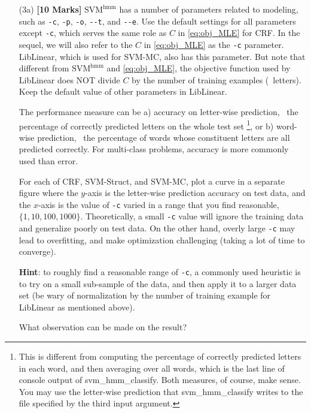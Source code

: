 \documentclass[11pt]{report}
\begin{document}
\begin{itemize}
	\item[(3a)] {\bf [10 Marks]} $\text{SVM}^{\text{hmm}}$ has a number of parameters related to modeling, such as \verb#-c#, \verb#-p#, \verb#-o#, \verb#--t#, and \verb#--e#.
	Use the default settings for all parameters except \verb#-c#,
	which serves the same role as $C$ in \eqref{eq:obj_MLE} for CRF.
	In the sequel, we will also refer to the $C$ in \eqref{eq:obj_MLE} as the \verb#-c# parameter.
	LibLinear, which is used for SVM-MC, also has this parameter.
	But note that different from $\text{SVM}^{\text{hmm}}$ and \eqref{eq:obj_MLE}, the objective function used by LibLinear does NOT divide $C$ by the number of training examples (\ie\ letters).
	Keep the default value of other parameters in LibLinear.
	
	The performance measure can be a) accuracy on letter-wise prediction, \ie\ the percentage of correctly predicted letters on the whole test set%
	\footnote{This is different from computing the percentage of correctly predicted letters in each word, and then averaging over all words, which is the last line of console output of \textsf{svm\_hmm\_classify}.  Both measures, of course, make sense.
		You may use the letter-wise prediction that \textsf{svm\_hmm\_classify} writes to the file specified by the third input argument.},
	or b) word-wise prediction, \ie\ the percentage of words whose constituent letters are all predicted correctly.
	For multi-class problems, accuracy is more commonly used than error.
	
	For each of CRF, SVM-Struct, and SVM-MC,
	plot a curve in a separate figure where the $y$-axis is the letter-wise prediction accuracy on test data,
	and the $x$-axis is the value of \verb#-c# varied in a range that you find reasonable,
	\eg\ $\{1, 10, 100, 1000\}$.
	Theoretically, a small \verb#-c# value will ignore the training data and generalize poorly on test data.
	On the other hand, overly large \verb#-c# may lead to overfitting, and make optimization challenging (taking a lot of time to converge).
	
	\textbf{Hint}: to roughly find a reasonable range of \verb#-c#, a commonly used heuristic is to try on a small sub-sample of the data, and then apply it to a larger data set (be wary of normalization by the number of training example for LibLinear as mentioned above).
	
	What observation can be made on the result?
	

\end{itemize}
\end{document}
